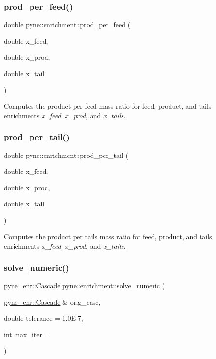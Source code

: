 \subsubsection{\texorpdfstring{prod\+\_\+per\+\_\+feed()}{prod\_per\_feed()}}
{\footnotesize\ttfamily double pyne\+::enrichment\+::prod\+\_\+per\+\_\+feed (\begin{DoxyParamCaption}\item[{double}]{x\+\_\+feed,  }\item[{double}]{x\+\_\+prod,  }\item[{double}]{x\+\_\+tail }\end{DoxyParamCaption})}

Computes the product per feed mass ratio for feed, product, and tails enrichments {\itshape x\+\_\+feed}, {\itshape x\+\_\+prod}, and {\itshape x\+\_\+tails}. \mbox{\label{namespacepyne_1_1enrichment_a1d7622f2e9706ef8cdfcc793e2818ad4}} 
\subsubsection{\texorpdfstring{prod\+\_\+per\+\_\+tail()}{prod\_per\_tail()}}
{\footnotesize\ttfamily double pyne\+::enrichment\+::prod\+\_\+per\+\_\+tail (\begin{DoxyParamCaption}\item[{double}]{x\+\_\+feed,  }\item[{double}]{x\+\_\+prod,  }\item[{double}]{x\+\_\+tail }\end{DoxyParamCaption})}

Computes the product per tails mass ratio for feed, product, and tails enrichments {\itshape x\+\_\+feed}, {\itshape x\+\_\+prod}, and {\itshape x\+\_\+tails}. \mbox{\label{namespacepyne_1_1enrichment_a589bcb5f70049e07f791cf0d029bcb4e}} 
\subsubsection{\texorpdfstring{solve\+\_\+numeric()}{solve\_numeric()}}
{\footnotesize\ttfamily \hyperlink{classpyne_1_1enrichment_1_1_cascade}{pyne\+\_\+enr\+::\+Cascade} pyne\+::enrichment\+::solve\+\_\+numeric (\begin{DoxyParamCaption}\item[{\hyperlink{classpyne_1_1enrichment_1_1_cascade}{pyne\+\_\+enr\+::\+Cascade} \&}]{orig\+\_\+casc,  }\item[{double}]{tolerance = {\ttfamily 1.0E-\/7},  }\item[{int}]{max\+\_\+iter = {} }\end{DoxyParamCaption})}

